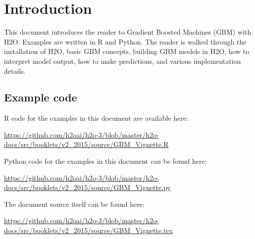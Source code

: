 \newpage

\tableofcontents


\newpage

\section{Introduction}
This document introduces the reader to Gradient Boosted Machines (GBM) with H2O.  
Examples are written in R and Python.
The reader is walked through the installation of H2O, basic GBM concepts, building GBM models in H2O, how to
interpret model output, how to make predictions, and various implementation details.





\newpage

\newcommand{\waterVersion}{3.0.1.4}



\subsection{Example code}

R code for the examples in this document are available here:

\url{https://github.com/h2oai/h2o-3/blob/master/h2o-docs/src/booklets/v2_2015/source/GBM_Vignette.R}

Python code for the examples in this document can be found here:

\url{https://github.com/h2oai/h2o-3/blob/master/h2o-docs/src/booklets/v2_2015/source/GBM_Vignette.py}

The document source itself can be found here:

\url{https://github.com/h2oai/h2o-3/blob/master/h2o-docs/src/booklets/v2_2015/source/GBM_Vignette.tex}

